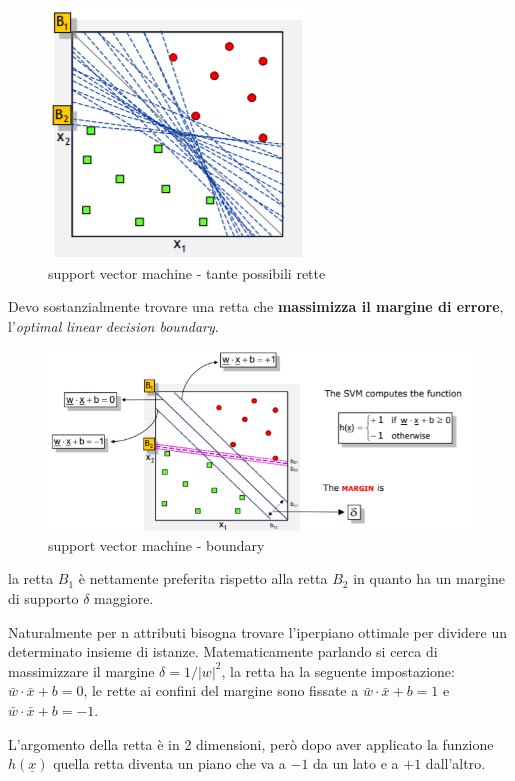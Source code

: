 \begin{figure}[H]
	\centering
	\includegraphics[height=0.4 \linewidth]{classification/pict/svm_rette.png}
	\caption{support vector machine - tante possibili rette}
\end{figure}

Devo sostanzialmente trovare una retta che \textbf{massimizza il margine di errore}, l'\textit{optimal linear decision boundary}. 

\begin{figure}[H]
	\hspace{-0.5cm}
	\includegraphics[height=0.45 \linewidth]{classification/pict/svm_boundary.png}
	\caption{support vector machine - boundary}
\end{figure}

la retta $B_1$ è nettamente preferita rispetto alla retta $B_2$ in quanto ha un margine di supporto $\delta$ maggiore. 

Naturalmente per n attributi bisogna trovare l'iperpiano ottimale per dividere un determinato insieme di istanze. Matematicamente parlando si cerca di massimizzare il margine $\delta = 1 / |w|^2$, la retta ha la seguente impostazione: $\bar{w} \cdot \bar{x} + b = 0$, le rette ai confini del margine sono fissate a $\bar{w} \cdot \bar{x} + b = 1$ e $\bar{w} \cdot \bar{x} + b = -1$. 

L'argomento della retta \`e in 2 dimensioni, per\`o dopo aver applicato la funzione $h(\underline{x})$ quella retta diventa un piano che va a $-1$ da un lato e a $+1$ dall'altro.

